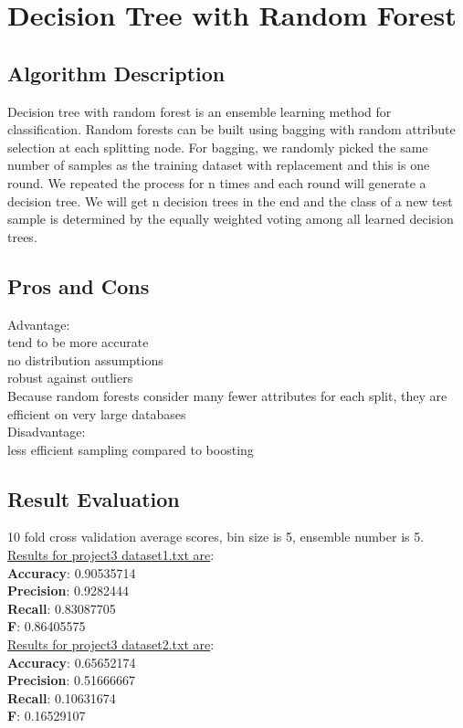 \documentclass[paper=letter, fontsize=11pt]{article}
\numberwithin{equation}{section}		%
\numberwithin{figure}{section}			%
\numberwithin{table}{section}				%
\begin{document}
\section{Decision Tree with Random Forest}
\subsection{Algorithm Description}
Decision tree with random forest is an ensemble learning method for classification.
Random forests can be built using bagging with random attribute selection at each
splitting node. For bagging, we randomly picked the same number of samples as the
training dataset with replacement and this is one round. We repeated the process for
n times and each round will generate a decision tree. We will get n decision trees in
the end and the class of a new test sample is determined by the equally weighted
voting among all learned decision trees.
\subsection{Pros and Cons}
Advantage:\\
tend to be more  accurate\\
no distribution assumptions\\
robust against outliers \\
 Because random forests consider many fewer attributes for each split, they are efficient
on very large databases\\
 \noindent Disadvantage:\\
 less efficient sampling compared to boosting\\
 
\subsection{Result Evaluation}
10 fold  cross validation average scores, bin size is 5, ensemble number is 5.
\\
\noindent \underline{ Results for project3 dataset1.txt are}: \\ 
\textbf{Accuracy}: 0.90535714\\
\textbf{Precision}: 0.9282444\\
\textbf{Recall}: 0.83087705\\
\textbf{F}: 0.86405575\\

\noindent \underline{ Results for project3 dataset2.txt are}: \\ 
\textbf{Accuracy}: 0.65652174\\
\textbf{Precision}: 0.51666667\\
\textbf{Recall}: 0.10631674\\
\textbf{F}: 0.16529107\\
\end{document}
